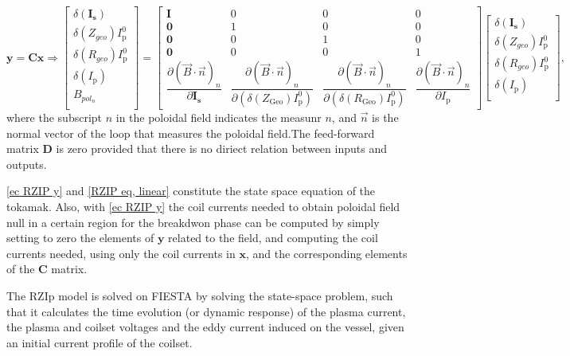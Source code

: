 \documentclass[a4paper,12pt,oneside]{book}
\newcommand{\p}{\partial}
\begin{document}
\begin{equation}\label{ec RZIP y}
\boldsymbol{y}=\boldsymbol{C} \boldsymbol{x} \Rightarrow
	\left[
	\begin{array}{c}
	\delta(\boldsymbol{I_\text{s}}) \\
	\delta(Z_{geo}) I_\text{p}^0 \\
	\delta(R_{geo}) I_\text{p}^0 \\
	\delta(I_\text{p}) \\
	B_{pol_n} \\
	\end{array}
	\right]
	=
	\left[
	\begin{array}{cccc}
	\boldsymbol{I} & 0 & 0 & 0\\
	\boldsymbol{0} & 1 & 0 & 0\\
	\boldsymbol{0} & 0 & 1 & 0\\	
	\boldsymbol{0} & 0 & 0 & 1\\	
	\dfrac{\p (\vec{B} \cdot \vec{n})_n}{\p \boldsymbol{I_				\text{s}}} & \dfrac{\p (\vec{B} \cdot \vec{n})_n}{\p (\delta(Z_\text{Geo})I_\text{p}^0)} & \dfrac{\p (\vec{B} \cdot \vec{n})_n}{\p (\delta(R_\text{Geo})I_\text{p}^0)} & \dfrac{\p (\vec{B} \cdot \vec{n})_n}{\p I_\text{p}}
	\end{array}
	\right]
	\left[
	\begin{array}{c}
	\delta(\boldsymbol{I_\text{s}}) \\
	\delta(Z_{geo}) I_\text{p}^0 \\
	\delta(R_{geo}) I_\text{p}^0 \\
	\delta(I_\text{p}) \\
	\end{array}\right],
\end{equation}
where the subscript $n$ in the poloidal field indicates the measunr $n$, and $\vec{n}$ is the normal vector of the loop that measures the poloidal field.The feed-forward matrix $\boldsymbol{D}$ is zero provided that there is no diriect relation between inputs and outputs. 

\eqref{ec RZIP y} and  \eqref{RZIP eq, linear} constitute the state space equation of the tokamak. Also, with \eqref{ec RZIP y} the coil currents needed to obtain poloidal field null in a certain region for the breakdwon phase can be computed by simply setting to zero the elements of $\boldsymbol{y}$ related to the field, and computing the coil currents needed, using only the coil currents in $\boldsymbol{x}$, and the corresponding elements of the $\boldsymbol{C}$ matrix. 


The RZIp model is solved on FIESTA by solving the state-space problem, such that it calculates the time evolution (or dynamic response) of the plasma current, the plasma and coilset voltages and the eddy current induced on the vessel, given an initial current profile of the coilset.
\end{document}
